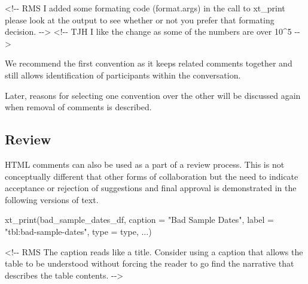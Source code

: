 \documentclass[
]{article}
\newenvironment{Shaded}{\begin{snugshade}}{\end{snugshade}}
\newcommand{\AttributeTok}[1]{\textcolor[rgb]{0.77,0.63,0.00}{#1}}
\newcommand{\FunctionTok}[1]{\textcolor[rgb]{0.00,0.00,0.00}{#1}}
\newcommand{\NormalTok}[1]{#1}
\newcommand{\StringTok}[1]{\textcolor[rgb]{0.31,0.60,0.02}{#1}}
\begin{document}
\begin{Shaded}
\begin{Highlighting}[]
\StringTok{\textasciigrave{}}\AttributeTok{\textless{}!{-}{-} RMS I added some formating code (format.args) in the call to xt\_print}
\AttributeTok{     please look at the output to see whether or not you prefer that formating}
\AttributeTok{     decision.}
\AttributeTok{ {-}{-}\textgreater{}}\StringTok{\textasciigrave{}}
\StringTok{\textasciigrave{}}\AttributeTok{\textless{}!{-}{-} TJH I like the change as some of the numbers are over 10\^{}5}
\AttributeTok{ {-}{-}\textgreater{}}\StringTok{\textasciigrave{}}
\end{Highlighting}
\end{Shaded}

We recommend the first convention as it keeps related comments together
and still allows identification of participants within the conversation.

Later, reasons for selecting one convention over the other will be
discussed again when removal of comments is described.

\hypertarget{review}{%
\subsection{Review}\label{review}}

HTML comments can also be used as a part of a review process. This is
not conceptually different that other forms of collaboration but the
need to indicate acceptance or rejection of suggestions and final
approval is demonstrated in the following versions of text.

\begin{Shaded}
\begin{Highlighting}[]
  \FunctionTok{xt\_print}\NormalTok{(bad\_sample\_dates\_df, }\AttributeTok{caption =} \StringTok{"Bad Sample Dates"}\NormalTok{,}
           \AttributeTok{label =} \StringTok{"tbl:bad{-}sample{-}dates"}\NormalTok{, }\AttributeTok{type =}\NormalTok{ type, ...)}
  

\StringTok{\textasciigrave{}}\AttributeTok{\textless{}!{-}{-} RMS The caption reads like a title. Consider using a caption that allows}
\AttributeTok{the table to be understood without forcing the reader to go find the }
\AttributeTok{narrative that describes the table contents.}
\AttributeTok{{-}{-}\textgreater{}}\StringTok{\textasciigrave{}}
\end{Highlighting}
\end{Shaded}
\end{document}
